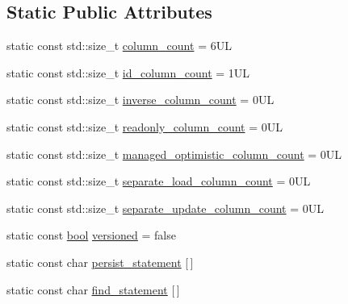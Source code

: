 \subsection*{Static Public Attributes}
\begin{DoxyCompactItemize}
\item 
static const std\+::size\+\_\+t \hyperlink{classodb_1_1access_1_1object__traits__impl_3_01_1_1_point_00_01id__pgsql_01_4_a8e7db955417aa23e3f07a4f73d456d5b}{column\+\_\+count} = 6\+U\+L
\item 
static const std\+::size\+\_\+t \hyperlink{classodb_1_1access_1_1object__traits__impl_3_01_1_1_point_00_01id__pgsql_01_4_a8c9b8a51ba26570cd18aa073662e4b47}{id\+\_\+column\+\_\+count} = 1\+U\+L
\item 
static const std\+::size\+\_\+t \hyperlink{classodb_1_1access_1_1object__traits__impl_3_01_1_1_point_00_01id__pgsql_01_4_a7667c13c971eed30fa41b19c5928e25b}{inverse\+\_\+column\+\_\+count} = 0\+U\+L
\item 
static const std\+::size\+\_\+t \hyperlink{classodb_1_1access_1_1object__traits__impl_3_01_1_1_point_00_01id__pgsql_01_4_a2d2bbcdc8687b369a02ec303c8776dcd}{readonly\+\_\+column\+\_\+count} = 0\+U\+L
\item 
static const std\+::size\+\_\+t \hyperlink{classodb_1_1access_1_1object__traits__impl_3_01_1_1_point_00_01id__pgsql_01_4_a798f4109603d3f1d2b76b3ed54459ddd}{managed\+\_\+optimistic\+\_\+column\+\_\+count} = 0\+U\+L
\item 
static const std\+::size\+\_\+t \hyperlink{classodb_1_1access_1_1object__traits__impl_3_01_1_1_point_00_01id__pgsql_01_4_a602088bb450436f20945ca1a6f373d87}{separate\+\_\+load\+\_\+column\+\_\+count} = 0\+U\+L
\item 
static const std\+::size\+\_\+t \hyperlink{classodb_1_1access_1_1object__traits__impl_3_01_1_1_point_00_01id__pgsql_01_4_a672a6f137edd7a84b76f84d90b961c73}{separate\+\_\+update\+\_\+column\+\_\+count} = 0\+U\+L
\item 
static const \hyperlink{classodb_1_1access_1_1object__traits_3_01_1_1_point_01_4_ab6e90357769eac9024011ae278acc043}{bool} \hyperlink{classodb_1_1access_1_1object__traits__impl_3_01_1_1_point_00_01id__pgsql_01_4_a7441966224459a7500419abe8938dc5a}{versioned} = false
\item 
static const char \hyperlink{classodb_1_1access_1_1object__traits__impl_3_01_1_1_point_00_01id__pgsql_01_4_a8054441ace0a86ce374a94922fb2e626}{persist\+\_\+statement} \mbox{[}$\,$\mbox{]}
\item 
static const char \hyperlink{classodb_1_1access_1_1object__traits__impl_3_01_1_1_point_00_01id__pgsql_01_4_afe8dc030c3522c878b2f66e6675cc370}{find\+\_\+statement} \mbox{[}$\,$\mbox{]}

\end{DoxyCompactItemize}
